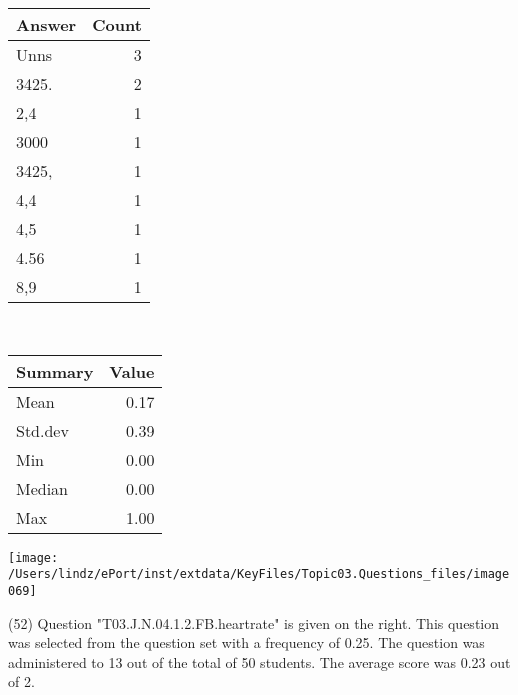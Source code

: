 \documentclass[12pt,english,nohyper]{tufte-handout}\usepackage[]{graphicx}\usepackage[]{color}
\begin{document}
\begin{center}%
\begin{tabular}{lr}
  \hline
Answer & Count \\ 
  \hline
Unns &   3 \\ 
  3425. &   2 \\ 
  2,4 &   1 \\ 
  3000 &   1 \\ 
  3425, &   1 \\ 
  4,4 &   1 \\ 
  4,5 &   1 \\ 
  4.56 &   1 \\ 
  8,9 &   1 \\ 
   \hline
\end{tabular}
~~~~~~~~%
\begin{tabular}{lr}
  \hline
Summary & Value \\ 
  \hline
Mean & 0.17 \\ 
  Std.dev & 0.39 \\ 
  Min & 0.00 \\ 
  Median & 0.00 \\ 
  Max & 1.00 \\ 
   \hline
\end{tabular}
\end{center}\newpage{}



\vspace{7cm}\begin{marginfigure}\texttt{[image: /Users/lindz/ePort/inst/extdata/KeyFiles/Topic03.Questions\_files/image069]}\end{marginfigure}\vspace{-7cm} (52) Question "T03.J.N.04.1.2.FB.heartrate" is given on the right. This question was selected from the question set with a frequency of 0.25. The question was administered to 13 out of the total of 50 students. The average score was 0.23 out of 2.
\end{document}
